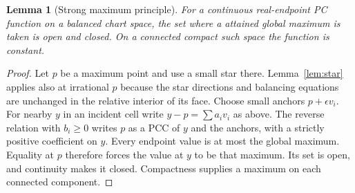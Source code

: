 \documentclass[11pt]{article}
\newtheorem{lemma}[theorem]{Lemma}
\theoremstyle{definition}\newtheorem{definition}[theorem]{Definition}
\theoremstyle{remark}\newtheorem{remark}[theorem]{Remark}
\begin{document}
\begin{lemma}[Strong maximum principle]\label{lem:maximum}
For a continuous real-endpoint PC function on a balanced chart space, the set where a attained global maximum is taken is open and closed. On a connected compact such space the function is constant.
\end{lemma}
\begin{proof}
Let $p$ be a maximum point and use a small star there. Lemma~\ref{lem:star} applies also at irrational $p$ because the star directions and balancing equations are unchanged in the relative interior of its face. Choose small anchors $p+\epsilon v_i$. For nearby $y$ in an incident cell write $y-p=\sum a_i v_i$ as above. The reverse relation with $b_i\geq0$ writes $p$ as a PCC of $y$ and the anchors, with a strictly positive coefficient on $y$. Every endpoint value is at most the global maximum. Equality at $p$ therefore forces the value at $y$ to be that maximum. Its set is open, and continuity makes it closed. Compactness supplies a maximum on each connected component.
\end{proof}
\end{document}
